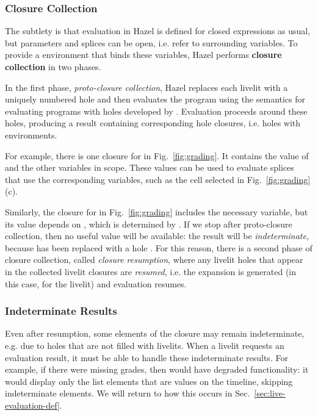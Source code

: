 \subsubsection{Closure Collection} The subtlety is that 
evaluation in Hazel is defined for closed expressions as usual,
but parameters and splices can be open, i.e. refer to surrounding variables. 
To provide a environment that binds these variables, 
Hazel performs \textbf{closure collection} in two phases.

In the first phase, \emph{proto-closure collection}, 
Hazel replaces each livelit with a uniquely numbered hole and then evaluates the program 
using the semantics for evaluating programs with holes developed by \citet{HazelnutLive}.
Evaluation proceeds around these holes, producing a result containing 
corresponding hole closures, i.e. holes with environments.

For example, there is one closure for  in Fig.~\ref{fig:grading}.
It contains the value of  and the other variables in scope. 
These values can be used to evaluate 
splices that use the corresponding variables, such as the cell selected in Fig.~\ref{fig:grading}(c). 

Similarly, the closure for  in Fig.~\ref{fig:grading} includes 
the necessary  variable, but 
its value depends on , which is determined by . 
If we stop after proto-closure collection,
then no useful value will be available:
the result will be \emph{indeterminate}, because  has been replaced with a hole \cite{HazelnutLive}.
For this reason, there is a second phase of closure collection, called \emph{closure resumption}, 
where any livelit holes that appear
in the collected livelit closures are \emph{resumed}, i.e. the expansion is generated
(in this case, for the  livelit) and evaluation resumes.


\subsubsection{Indeterminate Results}
Even after resumption, some elements of the closure may remain indeterminate, e.g. due to holes that 
are not filled with livelits. 
When a livelit requests an evaluation result, it must be able to handle these indeterminate results.
For example, if there were missing grades,
then  would have degraded functionality: 
it would display only the list elements that are values on the timeline, skipping indeterminate elements.
We will return to how this occurs in Sec.~\ref{sec:live-evaluation-def}.



